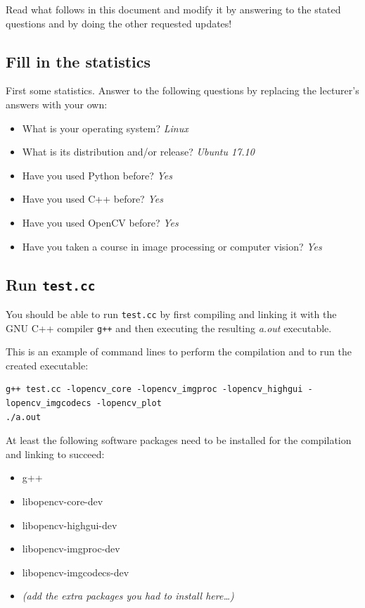 \documentclass{article}
\begin{document}
Read what follows in this document and modify it by answering to the
stated questions and by doing the other requested updates!


\subsection{Fill in the statistics}

First some statistics.  Answer to the following questions by replacing
the lecturer's answers with your own:

\begin{itemize}
\item What is your operating system? \emph{Linux}
\item What is its distribution and/or release? \emph{Ubuntu 17.10}
\item Have you used Python before? \emph{Yes}
\item Have you used C++ before? \emph{Yes}
\item Have you used OpenCV before? \emph{Yes}
\item Have you taken a course in image processing or computer vision? \emph{Yes}
\end{itemize}


\subsection{Run \texttt{test.cc}}

You should be able to run \texttt{test.cc} by first compiling and
linking it with the GNU C++ compiler \texttt{g++} and then executing
the resulting \emph{a.out} executable.

This is an example of command lines to perform the compilation and to
run the created executable:

{\small
\begin{verbatim}
g++ test.cc -lopencv_core -lopencv_imgproc -lopencv_highgui -lopencv_imgcodecs -lopencv_plot
./a.out
\end{verbatim}
}

At least the following software packages need to be installed for the
compilation and linking to succeed:

\begin{itemize}
\item g++
\item libopencv-core-dev
\item libopencv-highgui-dev
\item libopencv-imgproc-dev
\item libopencv-imgcodecs-dev
\item \emph{(add the extra packages you had to install here\ldots)}
\end{itemize}
\end{document}
